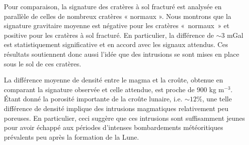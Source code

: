 Pour comparaison, la signature des cratères à sol fracturé est
analysée en parallèle de celles de nombreux cratères « normaux ».
Nous montrons que la signature gravitaire moyenne est négative pour
les cratères « normaux » et positive pour les cratères à sol
fracturé. En particulier, la différence de $\sim 3$ mGal est
statistiquement significative et en accord avec les signaux attendus.
Ces résultats soutiennent donc aussi l'idée que des intrusions se sont
mises en place sous le sol de ces cratères.

La différence moyenne de densité entre le magma et la croûte, obtenue
en comparant la signature observée et celle attendue, est proche de $900$ kg m$^{-3}$. Étant donné la
porosité importante de la croûte lunaire, i.e. $\sim 12\%$, une telle
différence de densité implique des intrusions magmatiques relativement
peu poreuses. En particulier, ceci suggère que ces intrusions sont
suffisamment jeunes pour avoir échappé aux périodes d’intenses
bombardements météoritiques prévalents peu après la formation de la
Lune.


